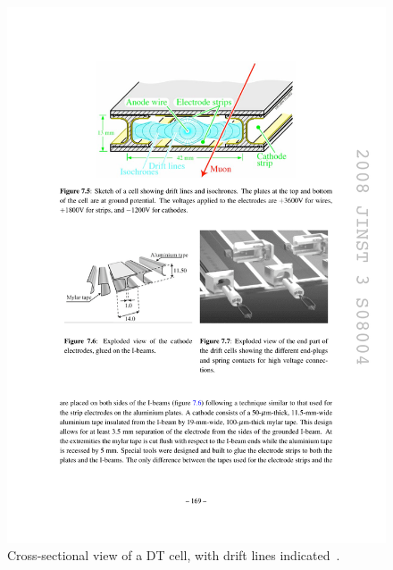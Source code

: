 \begin{figure}[hbtp]
  \begin{center}
    \includegraphics[width=1.5\cmsFigWidth]{figures/cms-muon-DTcell}
    \caption{Cross-sectional view of a DT cell, with drift lines indicated~\cite{1748-0221-3-08-S08004}.}
    \label{fig:cms-muon-DTcell}
  \end{center}
\end{figure}

